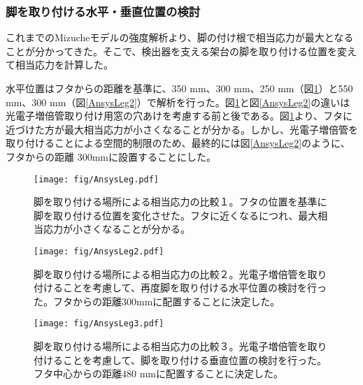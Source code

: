 \documentclass[11pt]{jreport}
\newcommand{\figref}[1]{図\ref{#1}}
\begin{document}
\subsubsection{脚を取り付ける水平・垂直位置の検討}
これまでのMizucheモデルの強度解析より、脚の付け根で相当応力が最大となることが分かってきた。そこで、検出器を支える架台の脚を取り付ける位置を変えて相当応力を計算した。

水平位置はフタからの距離を基準に、350 mm、300 mm、250 mm（\figref{AnsysLeg1}）と550 mm、300 mm（\figref{AnsysLeg2}）で解析を行った。\figref{AnsysLeg1}と\figref{AnsysLeg2}の違いは光電子増倍管取り付け用窓の穴あけを考慮する前と後である。\figref{AnsysLeg1}より、フタに近づけた方が最大相当応力が小さくなることが分かる。しかし、光電子増倍管を取り付けることによる空間的制限のため、最終的には\figref{AnsysLeg2}のように、フタからの距離 300mmに設置することにした。


\begin{figure}[htbp]
\centering
\texttt{[image: fig/AnsysLeg.pdf]}
\caption[脚を取り付ける場所による相当応力の比較１]{脚を取り付ける場所による相当応力の比較１。フタの位置を基準に脚を取り付ける位置を変化させた。フタに近くなるにつれ、最大相当応力が小さくなることが分かる。}
\label{AnsysLeg1}
\end{figure}

\begin{figure}[htbp]
\begin{minipage}{0.47\textwidth}
\centering
\texttt{[image: fig/AnsysLeg2.pdf]}
\caption[脚を取り付ける場所による相当応力の比較２]{脚を取り付ける場所による相当応力の比較２。光電子増倍管を取り付けることを考慮して、再度脚を取り付ける水平位置の検討を行った。フタからの距離300mmに配置することに決定した。}
\label{AnsysLeg2}
\end{minipage}
\hfill
\begin{minipage}{0.47\textwidth}
\centering
\texttt{[image: fig/AnsysLeg3.pdf]}
\caption[脚を取り付ける場所による相当応力の比較３]{脚を取り付ける場所による相当応力の比較３。光電子増倍管を取り付けることを考慮して、脚を取り付ける垂直位置の検討を行った。フタ中心からの距離480 mmに配置することに決定した。}
\label{AnsysLeg3}
\end{minipage}
\end{figure}
\end{document}
